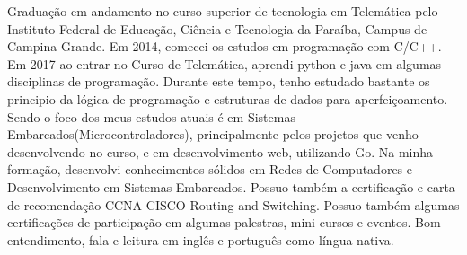 \begin{cvletter}
  Graduação em andamento no curso superior de tecnologia em Telemática pelo Instituto Federal de Educação, Ciência e Tecnologia da Paraíba, Campus de Campina Grande. Em 2014, comecei os estudos em programação com C/C++. Em 2017 ao entrar no Curso de Telemática, aprendi python e java em algumas disciplinas de programação. Durante este tempo, tenho estudado bastante os principio da lógica de programação e estruturas de dados para aperfeiçoamento. Sendo o foco dos meus estudos atuais é em Sistemas Embarcados(Microcontroladores), principalmente pelos projetos que venho desenvolvendo no curso, e em desenvolvimento web, utilizando Go. Na minha formação, desenvolvi conhecimentos sólidos em Redes de Computadores e Desenvolvimento em Sistemas Embarcados. Possuo também a certificação e carta de recomendação CCNA CISCO Routing and Switching. Possuo também algumas certificações de participação em algumas palestras, mini-cursos e eventos. Bom entendimento, fala e leitura em inglês e português como língua nativa.

\end{cvletter}